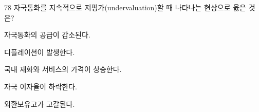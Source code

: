 \begin{question}{78}
자국통화를 지속적으로 저평가(undervaluation)할 때 나타나는 현상으로 옳은 것은?
\begin{choices}
  \item 자국통화의 공급이 감소된다.
  \item 디플레이션이 발생한다.
  \item 국내 재화와 서비스의 가격이 상승한다.
  \item 자국 이자율이 하락한다.
  \item 외환보유고가 고갈된다.
\end{choices}
\end{question}
